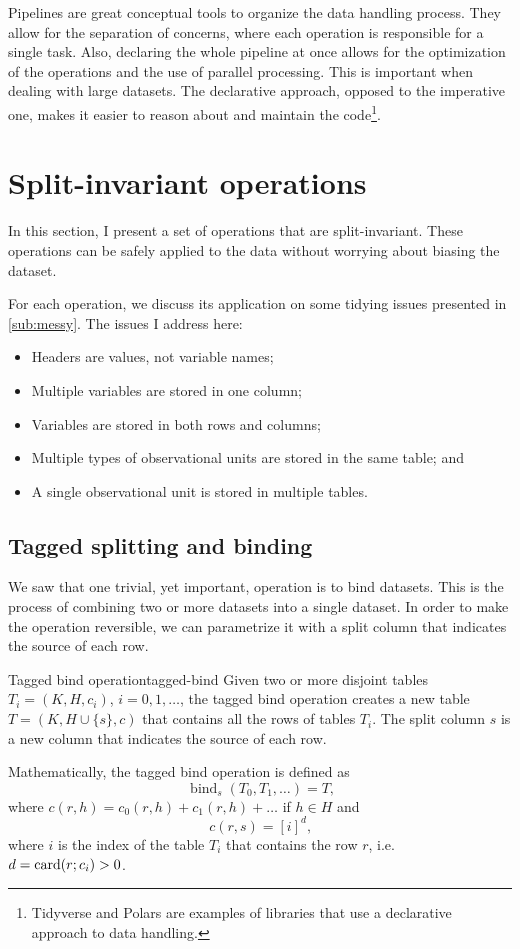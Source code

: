 Pipelines are great conceptual tools to organize the data handling process.  They allow
for the separation of concerns, where each operation is responsible for a single task.
Also, declaring the whole pipeline at once allows for the optimization of the operations
and the use of parallel processing.  This is important when dealing with large datasets.
The declarative approach, opposed to the imperative one, makes it easier to reason about
and maintain the code\footnote{Tidyverse and Polars are examples of
libraries that use a declarative approach to data handling.}.

\section{Split-invariant operations}

In this section, I present a set of operations that are split-invariant.  These operations
can be safely applied to the data without worrying about biasing the dataset.

For each operation, we discuss its application on some tidying issues presented in
\cref{sub:messy}.  The issues I address here:
\begin{itemize}
  \itemsep0em
  \item Headers are values, not variable names;
  \item Multiple variables are stored in one column; %
  \item Variables are stored in both rows and columns;
  \item Multiple types of observational units are stored in the same table; and %
  \item A single observational unit is stored in multiple tables.
\end{itemize}

\subsection{Tagged splitting and binding}

We saw that one trivial, yet important, operation is to bind datasets.  This is the
process of combining two or more datasets into a single dataset.  In order to make the
operation reversible, we can parametrize it with a split column that indicates the source
of each row.

\begin{defbox}{Tagged bind operation}{tagged-bind}
  Given two or more disjoint tables $T_i = (K, H, c_i)$, $i = 0, 1, \dots$, the tagged
  bind operation creates a new table $T = (K, H \cup \{s\}, c)$ that contains all the rows
  of tables $T_i$.  The split column $s$ is a new column that indicates the source of each
  row.

  Mathematically, the tagged bind operation is defined as \[
    \operatorname{bind}_{s}(T_0, T_1, \dots) = T\text{,}
  \] where $c(r, h) = c_0(r, h) + c_1(r, h) + \dots$ if $h \in H$ and \[
    c(r, s) = \left[ i \right]^{d} \text{,}
  \]
  where $i$ is the index of the table $T_i$ that contains the row $r$, i.e. $d =
  \rowcard[r; c_i] > 0$.
\end{defbox}

